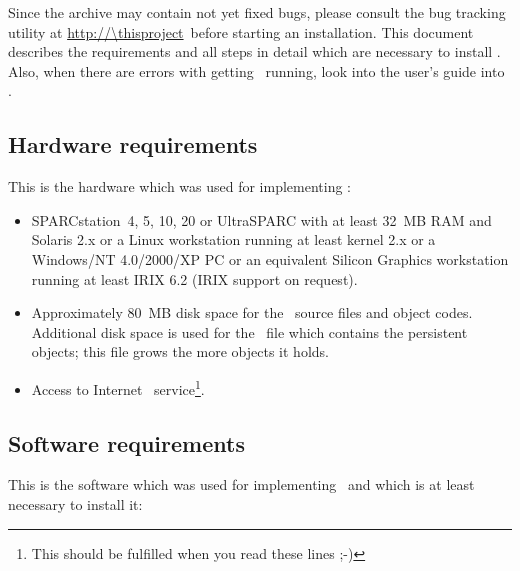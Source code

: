 Since the archive may contain not yet fixed bugs, please consult the
bug tracking utility at \url{http://\thisproject}\ before starting an
installation.  This document describes the requirements and all steps
in detail which are necessary to install \plob. Also, when there are
errors with getting \plob\ running, look into the user's guide into
.

\subsection{Hardware requirements}

This is the hardware which was used for implementing \plob:
\begin{itemize}
  
\item SPARCstation~4, 5, 10, 20 or UltraSPARC with at least 32~MB RAM
  and Solaris 2.x or a Linux workstation running at least kernel 2.x
  or a Windows/NT 4.0/2000/XP PC or an equivalent Silicon Graphics
  workstation running at least IRIX 6.2 (IRIX support on request).

\item Approximately 80~MB disk space for the \plob\ source files and
  object codes.  Additional disk space is used for the \postore\ file
  which contains the persistent objects; this file grows the more
  objects it holds.

\item Access to Internet \ service\footnote{This should be
    fulfilled when you read these lines ;-)}.

\end{itemize}

\subsection{Software requirements}

This is the software which was used for implementing \plob\ and which
is at least necessary to install it:

